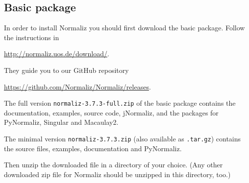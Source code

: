 \documentclass[12pt,a4paper]{scrartcl}
\theoremstyle{definition}
\def\ttt{\texttt}
\def\version{3.7.3}
\def\NmzDir{normaliz-\version}
\begin{document}
\subsection{Basic package}
In order to install Normaliz you should first download the
basic package. Follow the instructions in
\begin{center}
\url{http://normaliz.uos.de/download/}.
\end{center}
They guide you to our GitHub repository
\begin{center}
	\url{https://github.com/Normaliz/Normaliz/releases}.
\end{center}

The full version \ttt{\NmzDir-full.zip} of the basic package contains the documentation, examples, source
code, jNormaliz, and the packages for PyNormaliz, Singular
and Macaulay2. 


The minimal version \ttt{\NmzDir.zip} (also available as \ttt{.tar.gz}) contains the source files, examples, documentation and PyNormaliz.

Then unzip the downloaded file in a directory of your choice. (Any other
downloaded zip file for Normaliz should be unzipped in this
directory, too.)
\end{document}
